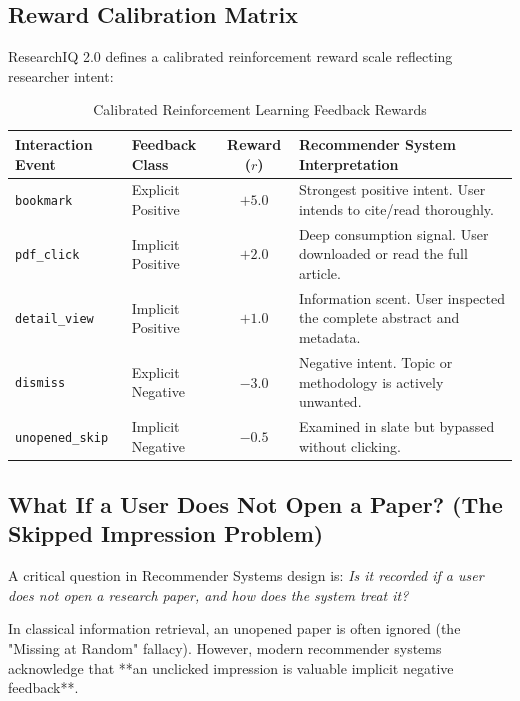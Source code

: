 \documentclass[11pt,a4paper]{article}
\begin{document}
\subsection{Reward Calibration Matrix}
ResearchIQ 2.0 defines a calibrated reinforcement reward scale reflecting researcher intent:
\begin{table}[H]
\centering
\small
\caption{Calibrated Reinforcement Learning Feedback Rewards}
\label{tab:recsys_rewards}
\begin{tabular}{@{}llcp{6.5cm}@{}}
\toprule
\textbf{Interaction Event} & \textbf{Feedback Class} & \textbf{Reward ($r$)} & \textbf{Recommender System Interpretation} \\
\midrule
\texttt{bookmark} & Explicit Positive & $+5.0$ & Strongest positive intent. User intends to cite/read thoroughly. \\
\texttt{pdf\_click} & Implicit Positive & $+2.0$ & Deep consumption signal. User downloaded or read the full article. \\
\texttt{detail\_view} & Implicit Positive & $+1.0$ & Information scent. User inspected the complete abstract and metadata. \\
\texttt{dismiss} & Explicit Negative & $-3.0$ & Negative intent. Topic or methodology is actively unwanted. \\
\texttt{unopened\_skip} & Implicit Negative & $-0.5$ & Examined in slate but bypassed without clicking. \\
\bottomrule
\end{tabular}
\end{table}

\subsection{What If a User Does Not Open a Paper? (The Skipped Impression Problem)}
A critical question in Recommender Systems design is: \textit{Is it recorded if a user does not open a research paper, and how does the system treat it?}

In classical information retrieval, an unopened paper is often ignored (the "Missing at Random" fallacy). However, modern recommender systems acknowledge that **an unclicked impression is valuable implicit negative feedback**.
\end{document}
